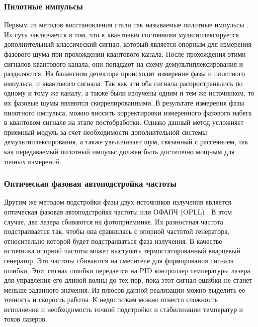 \subsubsection{Пилотные импульсы}Первым из методов восстановления стали так называемые пилотные импульсы \cite{wang2020}. Их суть заключается в том, что к квантовым состояниям мультиплексируется дополнительный классический сигнал, который является опорным для измерения фазового шума при прохождении квантового канала. После прохождения этими сигналов квантового канала, они попадают на схему демультиплексирования и разделяются. На балансном детекторе происходит измерение фазы и пилотного импульса, и квантового сигнала. Так как эти оба сигнала распространялись по одному и тому же каналу, а также были излучены одним и тем же источником, то их фазовые шумы являются скоррелированными. В результате измерения фазы  пилотного импульса, можно вносить корректировки измеренного фазового набега в квантовом сигнале на этапе постобработки. 
\newline Однако данный метод усложняет приемный модуль за счет необходимости дополнительной системы демультиплексирования, а также увеличивает шум, связанный с рассеянием, так как передаваемый  пилотный импульс должен быть достаточно мощным для точных измерений.
\subsubsection{Оптическая фазовая автоподстройка частоты}
Другим же методом подстройки фазы двух источников излучения является оптическая фазовая автоподстройка частоты или ОФАПЧ (OPLL) \cite{khaksar2023}. В этом случае, два лазера сбиваются на фотоприемнике. Их разностная частота подстраивается так, чтобы она сравнялась с опорной частотой генератора, относительно которой будет подстраиваться фаза излучения. 
В качестве источника опорной частоты может выступать термостатированный кварцевый генератор. Эти частоты сбиваются на смесителе для формирования сигнала ошибки. Этот сигнал ошибки передается на PID контроллер температуры лазера для управления его длиной волны до тех пор, пока этот сигнал ошибки не станет меньше заданного значения.
Из плюсов данной реализации можно выделить ее точность и скорость работы. К недостаткам можно отнести сложность исполнения и необходимость точной подстройки и стабилизации температур и токов лазеров.

